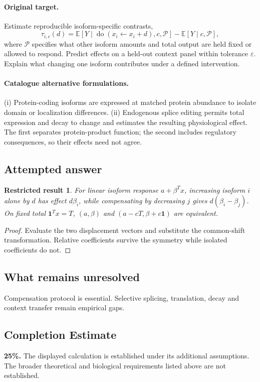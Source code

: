\documentclass[11pt]{article}
\newcommand{\E}{\mathbb E}
\providecommand{\E}{\mathbb E}
\newtheorem{attemptresult}{Restricted result}[section]
\begin{document}
\paragraph{Original target.}
Estimate reproducible isoform-specific contrasts,
\[
\tau_{i,c}(d)=\E[Y\mid\operatorname{do}(x_i\leftarrow x_i+d),c,\mathcal P]
-\E[Y\mid c,\mathcal P],
\]
where $\mathcal P$ specifies what other isoform amounts and total output are held fixed or allowed to respond. Predict effects on a held-out context panel within tolerance $\varepsilon$. Explain what changing one isoform contributes under a defined intervention.
\paragraph{Catalogue alternative formulations.}
(i) Protein-coding isoforms are expressed at matched protein abundance to isolate domain or localization differences. (ii) Endogenous splice editing permits total expression and decay to change and estimates the resulting physiological effect. The first separates protein-product function; the second includes regulatory consequences, so their effects need not agree.
\subsection{Attempted answer}
\begin{attemptresult}
For linear isoform response $a+\beta^Tx$, increasing isoform $i$ alone by $d$ has effect $d\beta_i$, while compensating by decreasing $j$ gives $d(\beta_i-\beta_j)$. On fixed total $\mathbf1^Tx=T$, $(a,\beta)$ and $(a-cT,\beta+c\mathbf1)$ are equivalent.
\end{attemptresult}
\begin{proof}
Evaluate the two displacement vectors and substitute the common-shift transformation. Relative coefficients survive the symmetry while isolated coefficients do not.
\end{proof}
\subsection{What remains unresolved}
Compensation protocol is essential. Selective splicing, translation, decay and context transfer remain empirical gaps.
\subsection{Completion Estimate}
\textbf{25\%.} The displayed calculation is established under its additional assumptions. The broader theoretical and biological requirements listed above are not established.
\end{document}

